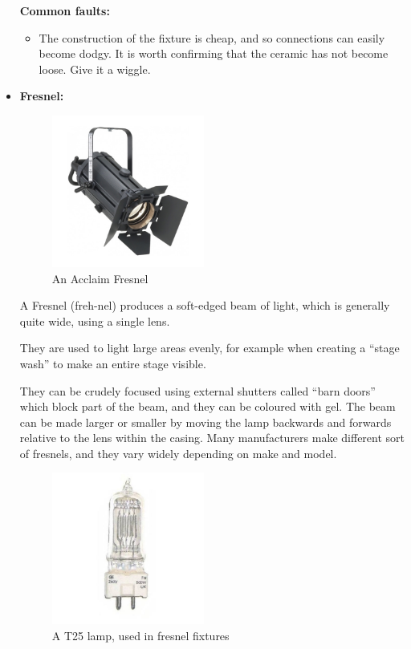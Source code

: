 \documentclass[14pt]{article} %
\begin{document}
\begin{itemize}
\textbf{Common faults:}
\begin{itemize}
\item The construction of the fixture is cheap, and so connections can easily become dodgy. It is worth confirming that the ceramic has not become loose. Give it a wiggle.
\end{itemize}

\item \textbf{Fresnel:} 

\begin{figure}[h]
\begin{center}

\includegraphics[height=5cm]{acclaim.jpg}
\caption{An Acclaim Fresnel}
\label{fig:fresnel}

\end{center}
\end{figure}

A Fresnel (freh-nel) produces a soft-edged beam of light, which is generally quite wide, using a single lens. 

They are used to light large areas evenly, for example when creating a “stage wash” to make an entire stage visible. 

They can be crudely focused using external shutters called “barn doors” which block part of the beam, and they can be coloured with gel. 
The beam can be made larger or smaller by moving the lamp backwards and forwards relative to the lens within the casing. 
Many manufacturers make different sort of fresnels, and they vary widely depending on make and model.

\begin{figure}[h]
\begin{center}

\includegraphics[height=5cm]{t25.jpg}
\caption{A T25 lamp, used in fresnel fixtures}
\label{fig:fresnel-lamp}


\end{center}
\end{figure}
\end{itemize}
\end{document}
